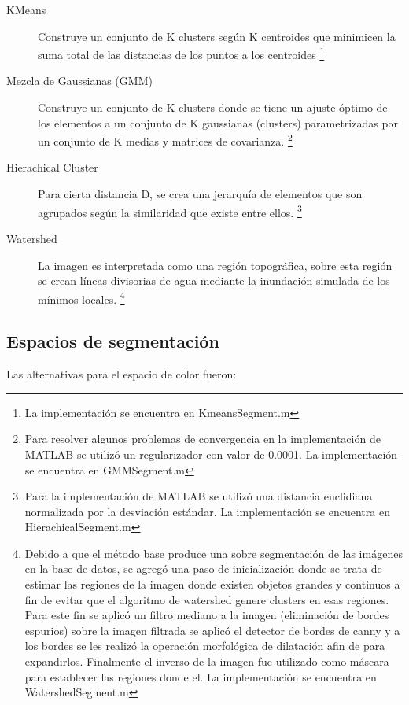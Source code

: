 \documentclass[10pt,twocolumn,letterpaper]{article}
\begin{document}
\begin{description}
\item[KMeans] Construye un conjunto de K clusters según K centroides que minimicen la suma total de las distancias de los puntos a los centroides \footnote{La implementación se encuentra en KmeansSegment.m} \cite{Jain2010}

\item[Mezcla de Gaussianas (GMM)] Construye un conjunto de K clusters donde se tiene un ajuste óptimo de los elementos a un conjunto de K gaussianas (clusters) parametrizadas por un conjunto de K medias y matrices de covarianza. \footnote{Para resolver algunos problemas de convergencia en la implementación de MATLAB se utilizó un regularizador con valor de 0.0001. La implementación se encuentra en GMMSegment.m} \cite{Banfield1993}

\item[Hierachical Cluster] Para cierta distancia D, se crea una jerarquía de elementos que son agrupados  según la similaridad que existe entre ellos. \footnote{Para la implementación de MATLAB se utilizó una distancia euclidiana normalizada por la desviación estándar. La implementación se encuentra en HierachicalSegment.m} \cite{Arifin2006}

\item[Watershed] La imagen es interpretada como una región topográfica, sobre esta región se crean líneas divisorias de agua mediante la inundación simulada de los mínimos locales.  \footnote{Debido a que el método base produce una sobre segmentación  de las imágenes en la base de datos, se agregó una paso de inicialización donde se trata de estimar las regiones de la imagen donde existen objetos grandes y continuos a fin de evitar que el algoritmo de watershed genere clusters en esas regiones. Para este fin  se aplicó un filtro mediano a la imagen (eliminación de bordes espurios) sobre la imagen filtrada se aplicó el detector de bordes de canny y a los bordes se les realizó la operación morfológica de dilatación afin de para expandirlos.  Finalmente el inverso de la imagen fue utilizado como máscara para establecer las regiones donde el. La implementación se encuentra en WatershedSegment.m} \cite{Shafarenko1997}

\end{description}


\subsection{Espacios de segmentación}
Las alternativas para el espacio de color fueron:
\end{document}

